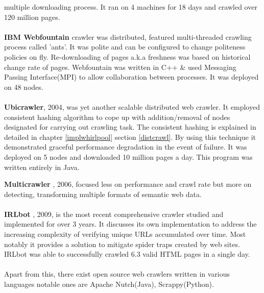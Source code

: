 multiple downloading process. It ran on 4 machines for 18 days and crawled over 120 million pages.
\\
\\
\textbf{IBM Webfountain}\cite{ibm} crawler was distributed, featured multi-threaded crawling process called 'ants'.
It was polite and can be configured to change politeness policies on fly. Re-downloading of pages a.k.a
freshness was based on historical change rate of pages. Webfountain was written in C++ \& used Messaging
Passing Interface(MPI) to allow collaboration between processes. It was deployed on 48 nodes.
\\
\\
\textbf{Ubicrawler}\cite{ubicrawler}, 2004, was yet another scalable distributed web crawler. It employed
consistent hashing algorithm to cope up with addition/removal of nodes designated for carrying out crawling
task. The consistent hashing is explained in detailed in chapter \ref{implwhirlpool} section
\ref{distcrawl}. By using this technique it demonstrated graceful performance degradation in the event of
failure. It was deployed on 5 nodes and downloaded 10 million pages a day. This program was written
entirely in Java.
\\
\pagebreak

\noindent
\textbf{Multicrawler} \cite{multicrawler}, 2006, focused less on performance and crawl rate but more on
detecting, transforming multiple formats of semantic web data.
\\
\\
\textbf{IRLbot} \cite{irlbot}, 2009, is the most recent comprehensive crawler studied and implemented for
over 3 years. It discusses its own implementation to address the increasing complexity of verifying unique
URLs accumulated over time. Most notably it provides a solution to mitigate spider traps created by web sites. IRLbot was able to successfully crawled 6.3 valid HTML pages in a single day.
\\
\\
Apart from this, there exist open source web crawlers written in various languages notable ones are Apache Nutch(Java), Scrappy(Python).
